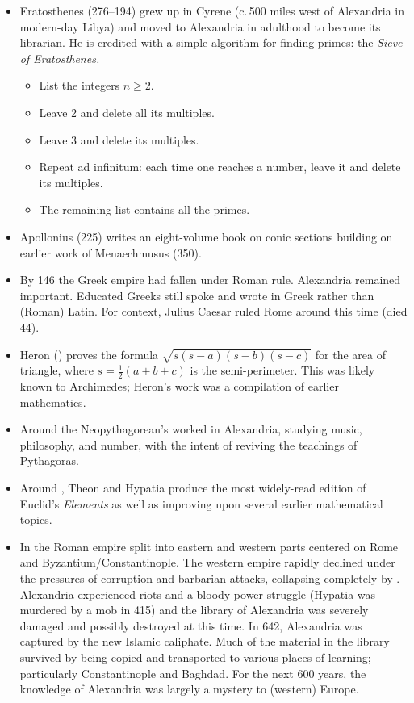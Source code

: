 \begin{itemize}\itemsep1pt
  \item Eratosthenes (276--194\BC) grew up in Cyrene (c.\,500 miles west of Alexandria in modern-day Libya) and moved to Alexandria in adulthood to become its librarian. He is credited with a simple algorithm for finding primes: the \emph{Sieve of Eratosthenes.}
  \begin{itemize}
    \item List the integers $n\ge 2$.
    \item Leave 2 and delete all its multiples.
    \item Leave 3 and delete its multiples.
    \item Repeat ad infinitum: each time one reaches a number, leave it and delete its multiples.
    \item The remaining list contains all the primes. 
  \end{itemize}

  \item Apollonius (225\BC) writes an eight-volume book on conic sections building on earlier work of Menaechmusus (350\BC).
  \item By 146\BC{} the Greek empire had fallen under Roman rule. Alexandria remained important. Educated Greeks still spoke and wrote in Greek rather than (Roman) Latin. For context, Julius Caesar ruled Rome around this time (died 44\BC).
  \item Heron () proves the formula $\sqrt{s(s-a)(s-b)(s-c)}$ for the area of triangle, where $s=\frac 12(a+b+c)$ is the semi-perimeter. This was likely known to Archimedes; Heron's work was a compilation of earlier mathematics.
  \item Around  the Neopythagorean's worked in Alexandria, studying music, philosophy, and number, with the intent of reviving the teachings of Pythagoras.
  \item Around , Theon and Hypatia produce the most widely-read edition of Euclid's \emph{Elements} as well as improving upon several earlier mathematical topics.
  \item In  the Roman empire split into eastern and western parts centered on Rome and Byzantium/Constantinople. The western empire rapidly declined under the pressures of corruption and barbarian attacks, collapsing completely by . Alexandria experienced riots and a bloody power-struggle (Hypatia was murdered by a mob in 415) and the library of Alexandria was severely damaged and possibly destroyed at this time. In 642, Alexandria was captured by the new Islamic caliphate. Much of the material in the library survived by being copied and transported to various places of learning; particularly Constantinople and Baghdad. For the next 600 years, the knowledge of Alexandria was largely a mystery to (western) Europe.
\end{itemize}


